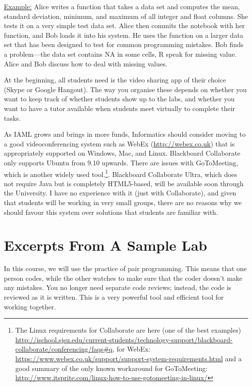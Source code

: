 \documentclass[11pt,a4paper]{article}
\begin{document}
\underline{Example:}  Alice writes a function that takes a data set and computes the mean, standard deviation, minimum, and maximum of all integer and float columns. She tests it on a very simple test data set. Alice then commits the notebook with her function, and Bob loads it into his system. He uses the function on a larger data set that has been designed to test for common programming mistakes. Bob finds a problem---the data set contains NA in some cells, R speak for missing value. Alice and Bob discuss how to deal with missing values. 

At the beginning, all students need is the video sharing app of their choice (Skype or Google Hangout). The way you organise these depends on whether you want to keep track of whether students show up to the labs, and whether you want to have a tutor available when students meet virtually to complete their tasks. 

As IAML grows and brings in more funds, Informatics should consider moving to a good videoconferencing system such as WebEx (\url{http://webex.co.uk}) that is appropriately supported on Windows, Mac, and Linux. Blackboard Collaborate only supports Ubuntu from 9.10 upwards. There are issues with GoToMeeting, which is another widely used tool.\footnote{The Linux requirements for Collaborate are here (one of the best examples) \url{http://ischool.sjsu.edu/current-students/technology-support/blackboard-collaborate/conferencing/faqs#q}, for WebEx: \url{https://www.webex.co.uk/support/support-system-requirements.html} and a good summary of the only known workaround for GoToMeeting: \small{\url{http://www.itsprite.com/linux-how-to-use-gotomeeting-in-linux/}}}. 
Blackboard Collaborate Ultra, which does not require Java but is completely HTML5-based, will be available soon through the University. I have no experience with it (just with Collaborate), and given that students will be working in very small groups, there are no reasons why we should favour this system over solutions that students are familiar with. 


\section{Excerpts From A Sample Lab}

In this course, we will use the practice of pair programming. This means that one person codes, while the other watches to make sure that the coder doesn't make any mistakes. You no longer need separate code reviews; instead, the code is reviewed as it is written. This is a very powerful tool and efficient tool for working together.
\end{document}
